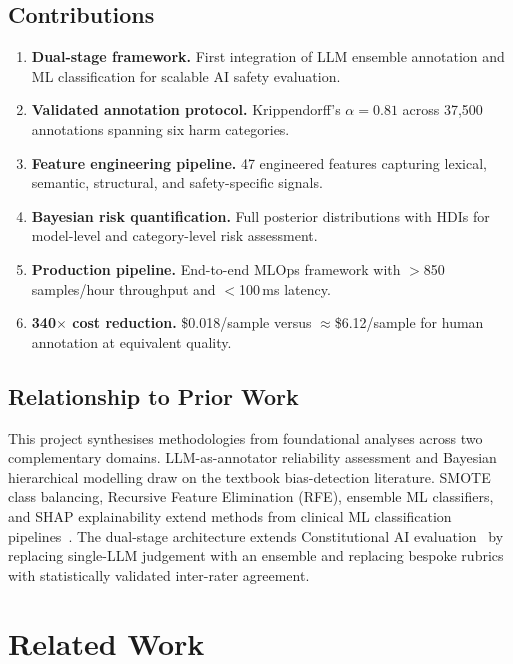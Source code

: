 \documentclass[10pt,letterpaper]{article}
\begin{document}
\subsection{Contributions}

\begin{enumerate}
  \item \textbf{Dual-stage framework.}  First integration of LLM ensemble
        annotation and ML classification for scalable AI safety evaluation.
  \item \textbf{Validated annotation protocol.}  Krippendorff's $\alpha = 0.81$
        across 37,500 annotations spanning six harm categories.
  \item \textbf{Feature engineering pipeline.}  47 engineered features
        capturing lexical, semantic, structural, and safety-specific signals.
  \item \textbf{Bayesian risk quantification.}  Full posterior distributions
        with HDIs for model-level and category-level risk assessment.
  \item \textbf{Production pipeline.}  End-to-end MLOps framework with
        $>$850 samples/hour throughput and $<$100\,ms latency.
  \item \textbf{340$\times$ cost reduction.}  \$0.018/sample versus
        ${\approx}$\$6.12/sample for human annotation at equivalent quality.
\end{enumerate}

\subsection{Relationship to Prior Work}

This project synthesises methodologies from foundational analyses across two
complementary domains.  LLM-as-annotator reliability assessment and Bayesian
hierarchical modelling draw on the textbook bias-detection literature.
SMOTE class balancing, Recursive Feature Elimination (RFE), ensemble ML
classifiers, and SHAP explainability extend methods from clinical ML
classification pipelines~\citep{chawla2002smote,lundberg2017shap}.  The dual-stage
architecture extends Constitutional AI evaluation~\citep{bai2022constitutional}
by replacing single-LLM judgement with an ensemble and replacing bespoke
rubrics with statistically validated inter-rater agreement.

\section{Related Work}
\label{sec:related}
\end{document}
